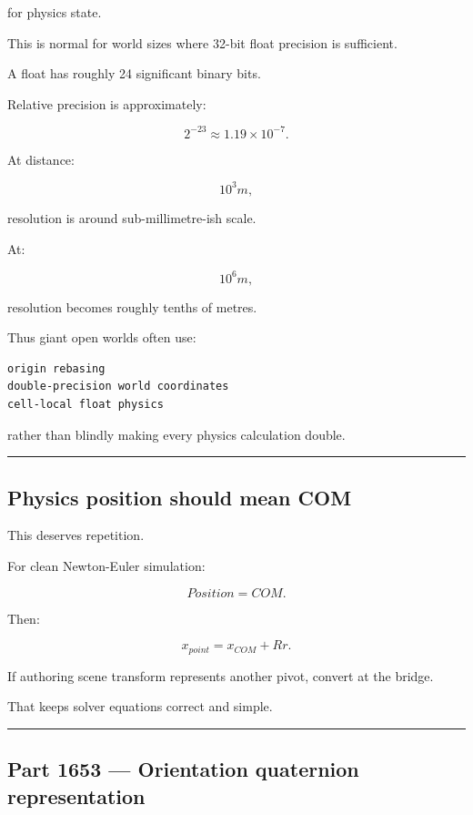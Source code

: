 for physics state.

This is normal for world sizes where 32-bit float precision is sufficient.

A float has roughly 24 significant binary bits.

Relative precision is approximately:

\[
2^{-23}
\approx1.19\times10^{-7}.
\]

At distance:

\[
10^3m,
\]

resolution is around sub-millimetre-ish scale.

At:

\[
10^6m,
\]

resolution becomes roughly tenths of metres.

Thus giant open worlds often use:

\begin{verbatim}
origin rebasing
double-precision world coordinates
cell-local float physics
\end{verbatim}

rather than blindly making every physics calculation double.

\begin{center}\rule{0.5\linewidth}{0.5pt}\end{center}

\subsection{Physics position should mean COM}\label{06-engine-ii-ch037-physics-position-should-mean-com}

This deserves repetition.

For clean Newton-Euler simulation:

\[
\boxed{
Position=COM.
}
\]

Then:

\[
x_{point}
=
x_{COM}
+
Rr.
\]

If authoring scene transform represents another pivot, convert at the bridge.

That keeps solver equations correct and simple.

\begin{center}\rule{0.5\linewidth}{0.5pt}\end{center}

\subsection{Part 1653 --- Orientation quaternion representation}\label{06-engine-ii-ch037-part-1653-orientation-quaternion-representation}

